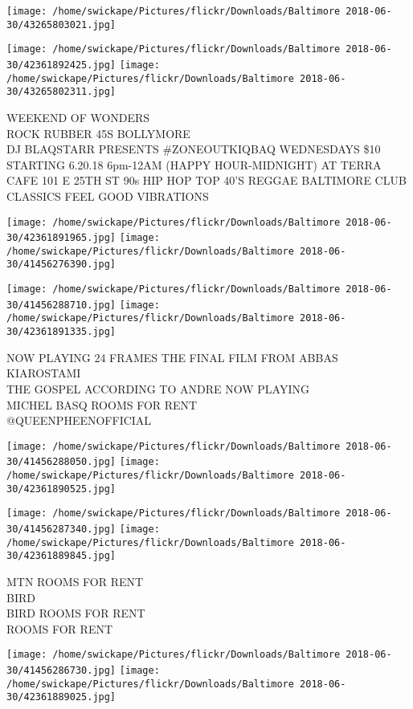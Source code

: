 \documentclass[10pt,letterpaper]{article}
\begin{document}
\texttt{[image: /home/swickape/Pictures/flickr/Downloads/Baltimore 2018-06-30/43265803021.jpg]}

\vspace{0.25in}
\texttt{[image: /home/swickape/Pictures/flickr/Downloads/Baltimore 2018-06-30/42361892425.jpg]}
\texttt{[image: /home/swickape/Pictures/flickr/Downloads/Baltimore 2018-06-30/43265802311.jpg]}

WEEKEND OF WONDERS\\
ROCK RUBBER 45S BOLLYMORE\\
DJ BLAQSTARR PRESENTS \#ZONEOUTKIQBAQ WEDNESDAYS \$10 STARTING 6.20.18 6pm{-}12AM (HAPPY HOUR{-}MIDNIGHT) AT TERRA CAFE 101 E 25TH ST 90s HIP HOP TOP 40'S REGGAE BALTIMORE CLUB CLASSICS FEEL GOOD VIBRATIONS
\pagebreak

\texttt{[image: /home/swickape/Pictures/flickr/Downloads/Baltimore 2018-06-30/42361891965.jpg]}
\texttt{[image: /home/swickape/Pictures/flickr/Downloads/Baltimore 2018-06-30/41456276390.jpg]}

\texttt{[image: /home/swickape/Pictures/flickr/Downloads/Baltimore 2018-06-30/41456288710.jpg]}
\texttt{[image: /home/swickape/Pictures/flickr/Downloads/Baltimore 2018-06-30/42361891335.jpg]}

NOW PLAYING 24 FRAMES THE FINAL FILM FROM ABBAS KIAROSTAMI\\
THE GOSPEL ACCORDING TO ANDRE NOW PLAYING\\
MICHEL BASQ ROOMS FOR RENT\\
@QUEENPHEENOFFICIAL
\pagebreak

\texttt{[image: /home/swickape/Pictures/flickr/Downloads/Baltimore 2018-06-30/41456288050.jpg]}
\texttt{[image: /home/swickape/Pictures/flickr/Downloads/Baltimore 2018-06-30/42361890525.jpg]}

\texttt{[image: /home/swickape/Pictures/flickr/Downloads/Baltimore 2018-06-30/41456287340.jpg]}
\texttt{[image: /home/swickape/Pictures/flickr/Downloads/Baltimore 2018-06-30/42361889845.jpg]}

MTN ROOMS FOR RENT\\
BIRD\\
BIRD ROOMS FOR RENT\\
ROOMS FOR RENT
\pagebreak

\texttt{[image: /home/swickape/Pictures/flickr/Downloads/Baltimore 2018-06-30/41456286730.jpg]}
\texttt{[image: /home/swickape/Pictures/flickr/Downloads/Baltimore 2018-06-30/42361889025.jpg]}
\end{document}
